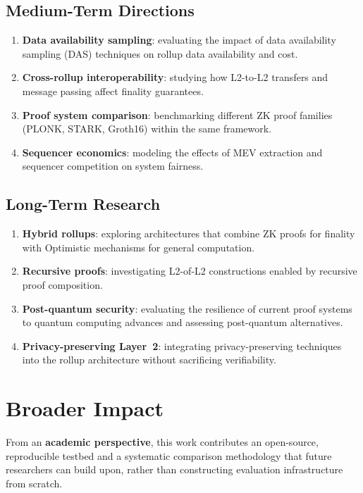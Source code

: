 \documentclass[
]{elteikthesis}[2024/04/26]
\begin{document}
\subsection{Medium-Term Directions}

\begin{enumerate}
    \item \textbf{Data availability sampling}: evaluating the impact of data availability sampling (DAS) techniques on rollup data availability and cost.
    \item \textbf{Cross-rollup interoperability}: studying how L2-to-L2 transfers and message passing affect finality guarantees.
    \item \textbf{Proof system comparison}: benchmarking different ZK proof families (PLONK, STARK, Groth16) within the same framework.
    \item \textbf{Sequencer economics}: modeling the effects of MEV extraction and sequencer competition on system fairness.
\end{enumerate}

\subsection{Long-Term Research}

\begin{enumerate}
    \item \textbf{Hybrid rollups}: exploring architectures that combine ZK proofs for finality with Optimistic mechanisms for general computation.
    \item \textbf{Recursive proofs}: investigating L2-of-L2 constructions enabled by recursive proof composition.
    \item \textbf{Post-quantum security}: evaluating the resilience of current proof systems to quantum computing advances and assessing post-quantum alternatives.
    \item \textbf{Privacy-preserving Layer~2}: integrating privacy-preserving techniques into the rollup architecture without sacrificing verifiability.
\end{enumerate}

\section{Broader Impact}

From an \textbf{academic perspective}, this work contributes an open-source, reproducible testbed and a systematic comparison methodology that future researchers can build upon, rather than constructing evaluation infrastructure from scratch.
\end{document}
